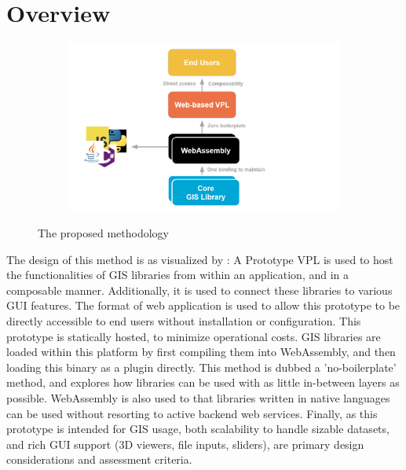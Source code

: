 \section{Overview}

\graphicspath{{../../assets/images/1/}}

\begin{figure}
  \centering
  \begin{subfigure}[b]{0.80\linewidth}
    \centering
    \includegraphics[width=\linewidth]{proposal.png}
  \end{subfigure}%
  \caption{The proposed methodology}
  \label{fig:proposal}
\end{figure}

The design of this method is as visualized by : 
A Prototype VPL is used to host the functionalities of \ac{GIS} libraries from within an application, and in a composable manner. Additionally, it is used to connect these libraries to various \ac{GUI} features. 
The format of web application is used to allow this prototype to be directly accessible to end users without installation or configuration. 
This prototype is statically hosted, to minimize operational costs.
\ac{GIS} libraries are loaded within this platform by first compiling them into WebAssembly, and then loading this binary as a plugin directly. 
This method is dubbed a 'no-boilerplate' method, and explores how libraries can be used with as little in-between layers as possible.
WebAssembly is also used to that libraries written in native languages can be used without resorting to active backend web services. 
Finally, as this prototype is intended for \ac{GIS} usage, both scalability to handle sizable datasets, and rich \ac{GUI} support (3D viewers, file inputs, sliders), are primary design considerations and assessment criteria. 

